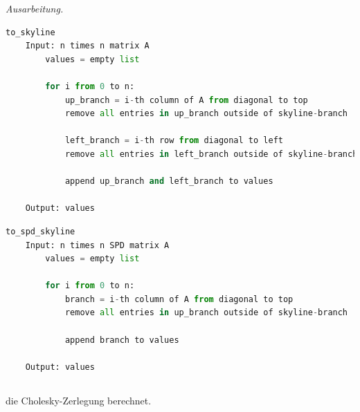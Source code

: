 \documentclass[titlepage]{article}
\newenvironment{ausarbeitung}{\vspace{3mm}\noindent\textit{Ausarbeitung.}}{}
\begin{document}
\begin{ausarbeitung}
	\begin{lstlisting}[language=Python, caption=Strukturerkennung einer nicht notwendigerweise symmetrischen Skyline-Matrix]
	to_skyline
	Input: n times n matrix A
		values = empty list
	
		for i from 0 to n:
			up_branch = i-th column of A from diagonal to top
			remove all entries in up_branch outside of skyline-branch
	
			left_branch = i-th row from diagonal to left
			remove all entries in left_branch outside of skyline-branch
			
			append up_branch and left_branch to values
	
	Output: values\end{lstlisting}
	
	\begin{lstlisting}[language=Python, caption=Strukturerkennung einer symmetrischen positiv definiten Skyline-Matrix]
	to_spd_skyline
	Input: n times n SPD matrix A			
		values = empty list
		
		for i from 0 to n:
			branch = i-th column of A from diagonal to top
			remove all entries in up_branch outside of skyline-branch
			
			append branch to values
		
	Output: values\end{lstlisting}
\end{ausarbeitung}


\subsection{}
die Cholesky-Zerlegung berechnet.
\end{document}
